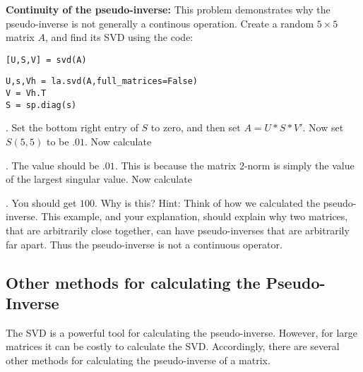 \begin{problem}
{\bf Continuity of the pseudo-inverse:} This problem demonstrates why the pseudo-inverse is not generally a continous operation. Create a random $5 \times 5$ matrix $A$, and find its SVD using the code:
\begin{matlab}
\begin{lstlisting}[style=matlab]
[U,S,V] = svd(A)
\end{lstlisting}
\end{matlab}
\begin{python}
\begin{lstlisting}[style=python]
U,s,Vh = la.svd(A,full_matrices=False)
V = Vh.T
S = sp.diag(s)
\end{lstlisting}
\end{python}.
Set the bottom right entry of $S$ to zero, and then set $A = U*S*V'$. Now set $S(5,5)$ to be $.01$. Now calculate \begin{matlab}\end{matlab}\begin{python}\end{python}. The value should be $.01$. This is because the matrix $2$-norm is simply the value of the largest singular value. Now calculate \begin{matlab}\end{matlab}\begin{python}\end{python}. You should get $100$. Why is this? Hint: Think of how we calculated the pseudo-inverse. This example, and your explanation, should explain why two matrices, that are arbitrarily close together, can have pseudo-inverses that are arbitrarily far apart. Thus the pseudo-inverse is not a continuous operator.
\end{problem}

\subsection*{Other methods for calculating the Pseudo-Inverse}

The SVD is a powerful tool for calculating the pseudo-inverse. However, for large matrices it can be costly to calculate the SVD. Accordingly, there are several other methods for calculating the pseudo-inverse of a matrix.

